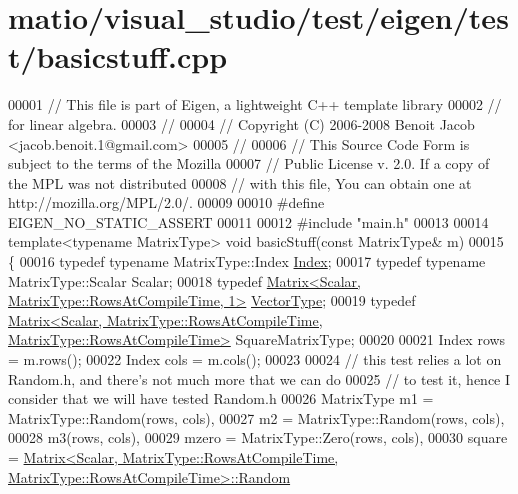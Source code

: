 \hypertarget{matio_2visual__studio_2test_2eigen_2test_2basicstuff_8cpp_source}{}\section{matio/visual\+\_\+studio/test/eigen/test/basicstuff.cpp}
\label{matio_2visual__studio_2test_2eigen_2test_2basicstuff_8cpp_source}

\begin{DoxyCode}
00001 \textcolor{comment}{// This file is part of Eigen, a lightweight C++ template library}
00002 \textcolor{comment}{// for linear algebra.}
00003 \textcolor{comment}{//}
00004 \textcolor{comment}{// Copyright (C) 2006-2008 Benoit Jacob <jacob.benoit.1@gmail.com>}
00005 \textcolor{comment}{//}
00006 \textcolor{comment}{// This Source Code Form is subject to the terms of the Mozilla}
00007 \textcolor{comment}{// Public License v. 2.0. If a copy of the MPL was not distributed}
00008 \textcolor{comment}{// with this file, You can obtain one at http://mozilla.org/MPL/2.0/.}
00009 
00010 \textcolor{preprocessor}{#define EIGEN\_NO\_STATIC\_ASSERT}
00011 
00012 \textcolor{preprocessor}{#include "main.h"}
00013 
00014 \textcolor{keyword}{template}<\textcolor{keyword}{typename} MatrixType> \textcolor{keywordtype}{void} basicStuff(\textcolor{keyword}{const} MatrixType& m)
00015 \{
00016   \textcolor{keyword}{typedef} \textcolor{keyword}{typename} MatrixType::Index \hyperlink{namespace_eigen_a62e77e0933482dafde8fe197d9a2cfde}{Index};
00017   \textcolor{keyword}{typedef} \textcolor{keyword}{typename} MatrixType::Scalar Scalar;
00018   \textcolor{keyword}{typedef} \hyperlink{group___core___module_class_eigen_1_1_matrix}{Matrix<Scalar, MatrixType::RowsAtCompileTime, 1>} 
      \hyperlink{struct_vector_type}{VectorType};
00019   \textcolor{keyword}{typedef} 
      \hyperlink{group___core___module_class_eigen_1_1_matrix}{Matrix<Scalar, MatrixType::RowsAtCompileTime, MatrixType::RowsAtCompileTime>}
       SquareMatrixType;
00020 
00021   Index rows = m.rows();
00022   Index cols = m.cols();
00023 
00024   \textcolor{comment}{// this test relies a lot on Random.h, and there's not much more that we can do}
00025   \textcolor{comment}{// to test it, hence I consider that we will have tested Random.h}
00026   MatrixType m1 = MatrixType::Random(rows, cols),
00027              m2 = MatrixType::Random(rows, cols),
00028              m3(rows, cols),
00029              mzero = MatrixType::Zero(rows, cols),
00030              square = 
      \hyperlink{group___core___module_class_eigen_1_1_matrix}{Matrix<Scalar, MatrixType::RowsAtCompileTime, MatrixType::RowsAtCompileTime>::Random}

\end{DoxyCode}

